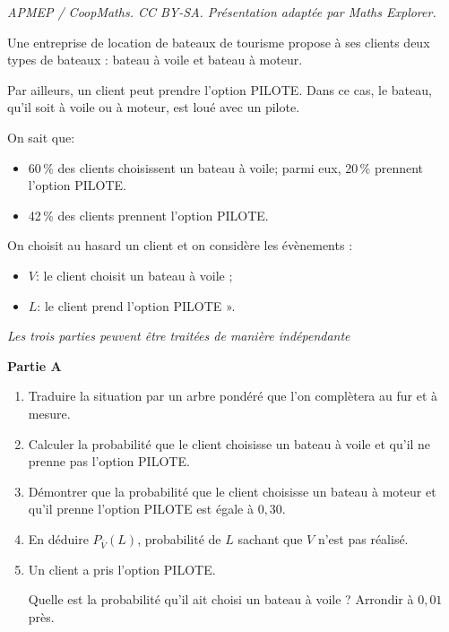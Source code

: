 \documentclass[10pt]{article}
\begin{document}
\noindent\textit{APMEP / CoopMaths. CC BY-SA. Présentation adaptée par Maths Explorer.}\par\medskip
\medskip

Une entreprise de location de bateaux de tourisme propose à ses clients deux types de bateaux : bateau à voile et bateau à moteur.

Par ailleurs, un client peut prendre l'option PILOTE. Dans ce cas, le bateau, qu'il soit à voile ou à moteur, est loué avec un pilote.

On sait que:
\begin{itemize}
\item[$\bullet~$] 60\,\% des clients choisissent un bateau à voile;
parmi eux, 20\,\% prennent l'option PILOTE.
\item[$\bullet~$] 42\,\% des clients prennent l'option PILOTE.
\end{itemize}

On choisit au hasard un client et on considère les évènements :

\begin{itemize}
\item[$\bullet~$]$V$: \og le client choisit un bateau à voile\fg{} ;
\item[$\bullet~$]$L$: \og le client prend l'option PILOTE ».
\end{itemize}

\begin{center}\emph{Les trois parties peuvent être traitées de manière indépendante}\end{center}

\medskip

\textbf{Partie A}

\medskip

\medskip

\begin{enumerate}
\item Traduire la situation par un arbre pondéré que l'on complètera au fur et à mesure.
\item Calculer la probabilité que le client choisisse un bateau à voile et qu'il ne prenne pas l'option PILOTE.
\item Démontrer que la probabilité que le client choisisse un bateau à moteur et qu'il prenne l'option PILOTE est égale à $0,30$.
\item En déduire $P_{\overline{V}}(L)$, probabilité de $L$ sachant que $V$ n'est pas réalisé.
\item Un client a pris l'option PILOTE.

Quelle est la probabilité qu'il ait choisi un bateau à voile ? Arrondir à $0,01$ près.
\end{enumerate}
\end{document}
